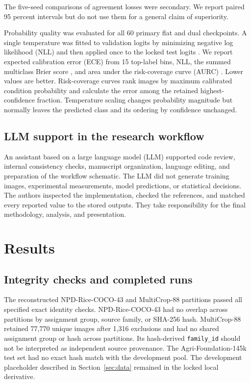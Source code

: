 \documentclass[preprint,12pt]{elsarticle}
\begin{document}
The five-seed comparisons of agreement losses were secondary. We report paired
95 percent intervals but do not use them for a general claim of superiority.

Probability quality was evaluated for all 60 primary flat and dual checkpoints.
A single temperature was fitted to validation logits by minimizing negative log
likelihood (NLL) and then applied once to the locked test logits
\cite{guo2017}. We report expected calibration error (ECE) from 15 top-label
bins, NLL, the summed multiclass Brier score \cite{brier1950}, and area under
the risk-coverage curve (AURC) \cite{geifman2017}. Lower values are better.
Risk-coverage curves rank images by maximum calibrated condition probability
and calculate the error among the retained highest-confidence fraction.
Temperature scaling changes probability magnitude but normally leaves the
predicted class and its ordering by confidence unchanged.

\subsection{LLM support in the research workflow}
\label{sec:ai-methods}

An assistant based on a large language model (LLM) supported code review,
internal consistency checks, manuscript organization, language editing, and
preparation of the workflow schematic. The LLM did not generate training
images, experimental measurements, model predictions, or statistical decisions.
The authors inspected the implementation, checked the references, and matched
every reported value to the stored outputs. They take responsibility for the
final methodology, analysis, and presentation.

\section{Results}
\label{sec:results}

\subsection{Integrity checks and completed runs}

The reconstructed NPD-Rice-COCO-43 and MultiCrop-88 partitions passed all
specified exact identity checks. NPD-Rice-COCO-43 had no overlap across
partitions by assignment group, source family, or SHA-256 hash. MultiCrop-88
retained 77,770 unique images after 1,316 exclusions and had no shared
assignment group or hash across partitions. Its hash-derived
\texttt{family\_id} should not be interpreted as independent source provenance.
The Agri-Foundation-145k test set had no exact hash match with the development
pool. The development placeholder described in Section~\ref{sec:data} remained
in the locked local derivative.
\end{document}
